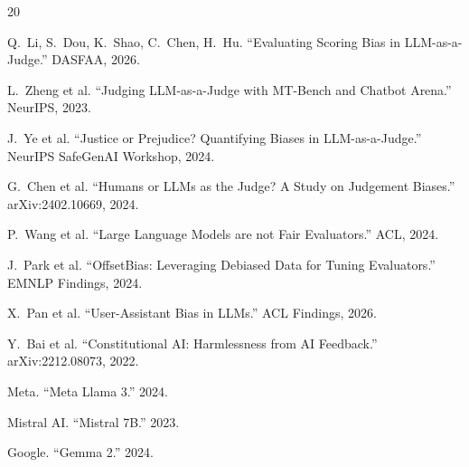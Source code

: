 \documentclass[11pt]{article}
\begin{document}
\begin{thebibliography}{20}

Q.~Li, S.~Dou, K.~Shao, C.~Chen, H.~Hu. ``Evaluating Scoring Bias in LLM-as-a-Judge.'' DASFAA, 2026.

L.~Zheng et al. ``Judging LLM-as-a-Judge with MT-Bench and Chatbot Arena.'' NeurIPS, 2023.

J.~Ye et al. ``Justice or Prejudice? Quantifying Biases in LLM-as-a-Judge.'' NeurIPS SafeGenAI Workshop, 2024.

G.~Chen et al. ``Humans or LLMs as the Judge? A Study on Judgement Biases.'' arXiv:2402.10669, 2024.

P.~Wang et al. ``Large Language Models are not Fair Evaluators.'' ACL, 2024.

J.~Park et al. ``OffsetBias: Leveraging Debiased Data for Tuning Evaluators.'' EMNLP Findings, 2024.

X.~Pan et al. ``User-Assistant Bias in LLMs.'' ACL Findings, 2026.

Y.~Bai et al. ``Constitutional AI: Harmlessness from AI Feedback.'' arXiv:2212.08073, 2022.

Meta. ``Meta Llama 3.'' 2024.

Mistral AI. ``Mistral 7B.'' 2023.

Google. ``Gemma 2.'' 2024.

\end{thebibliography}
\end{document}
